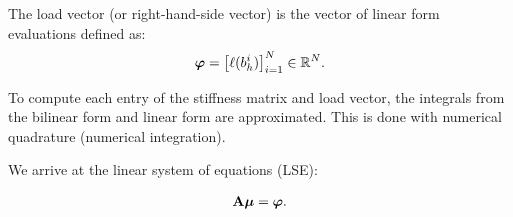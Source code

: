 \begin{definition}
    \label{def:load_vec}
    The load vector (or right-hand-side vector) is the vector of linear form evaluations
    defined as:
    \begin{align}
        \boldsymbol{\varphi} = \left[ \ell(b_h^i) \right]^N_{i=1} \in \mathbb{R}^{N}.
        \label{eq:load_vec}
    \end{align}
\end{definition}

To compute each entry of the stiffness matrix and load vector,
the integrals from the bilinear form and linear form are approximated.
This is done with numerical quadrature (numerical integration).

We arrive at the linear system of equations (LSE):

\begin{align}
    \mathbf{A}\boldsymbol{\mu} = \boldsymbol{\varphi}.
\end{align}
